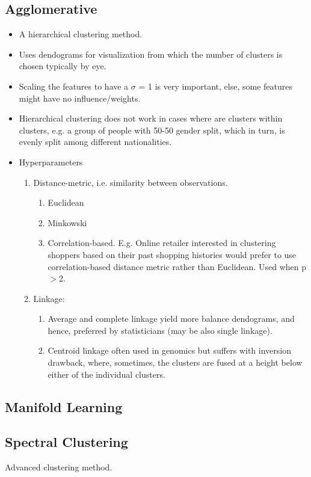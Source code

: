 \documentclass[a4paper, 12pt]{report}
\begin{document}
\subsection{Agglomerative}
\begin{itemize}
\item A hierarchical clustering method.
\item Uses dendograms for visualization from which the number of clusters is chosen typically by eye.
\item Scaling the features to have a $\sigma$ = 1 is very important, else, some features might have no influence/weights.
\item Hierarchical clustering does not work in cases where are clusters within clusters, e.g. a group of people with 50-50 gender split, which in turn, is evenly split among different nationalities. 
\item Hyperparameters
\begin{enumerate}
\item Distance-metric, i.e. similarity between observations.
\begin{enumerate}
\item Euclidean
\item Minkowski
\item Correlation-based. E.g. Online retailer interested in clustering shoppers based on their past shopping histories would prefer to use correlation-based distance metric rather than Euclidean. Used when p$>$2.
\end{enumerate}
\item Linkage: 
\begin{enumerate}
\item Average and complete linkage yield more balance dendograms, and hence, preferred by statisticians (may be also single linkage). 
\item Centroid linkage often used in genomics but suffers with inversion drawback, where, sometimes, the clusters are fused at a height below either of the individual clusters.
\end{enumerate}
\end{enumerate}

\end{itemize}


\subsection{Manifold Learning}

\subsection{Spectral Clustering}
Advanced clustering method.
\end{document}
